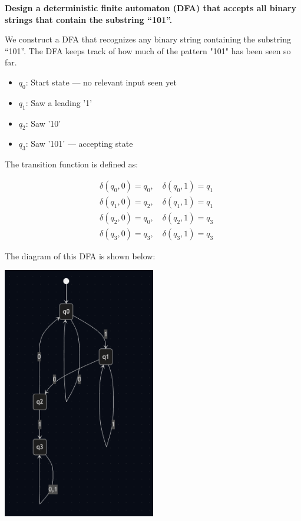 \documentclass{article}
\begin{document}
\textbf{Design a deterministic finite automaton (DFA) that accepts all binary strings that contain the substring “101”.}

We construct a DFA that recognizes any binary string containing the substring “101”.  
The DFA keeps track of how much of the pattern "101" has been seen so far.

\begin{itemize}
  \item \(q_0\): Start state — no relevant input seen yet
  \item \(q_1\): Saw a leading '1'
  \item \(q_2\): Saw '10'
  \item \(q_3\): Saw '101' — accepting state
\end{itemize}

The transition function is defined as:

\[
\begin{aligned}
&\delta(q_0, 0) = q_0,\quad \delta(q_0, 1) = q_1 \\
&\delta(q_1, 0) = q_2,\quad \delta(q_1, 1) = q_1 \\
&\delta(q_2, 0) = q_0,\quad \delta(q_2, 1) = q_3 \\
&\delta(q_3, 0) = q_3,\quad \delta(q_3, 1) = q_3
\end{aligned}
\]

The diagram of this DFA is shown below:

\begin{center}
  \includegraphics[width=0.5\textwidth]{q4-a-i.png}
\end{center}
\end{document}
